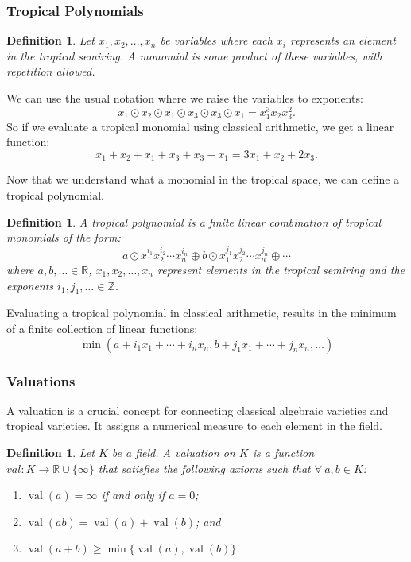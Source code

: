 \documentclass[11pt,reqno,a4paper]{article}
\theoremstyle{theoremstyle}
\theoremstyle{examplestyle}
\newtheorem{definition}[theorem]{Definition}
\theoremstyle{algorithmstyle}
\numberwithin{equation}{subsection}
\newcommand{\RR}{\mathbb{R}}
\DeclareMathOperator{\val}{val}
\begin{document}
\subsubsection*{Tropical Polynomials}

\begin{definition}
    Let $x_1, x_2, \ldots , x_n$ be variables where each $x_i$ represents an element in the tropical semiring. A \textit{monomial} is some product of these variables, with repetition allowed. 
\end{definition}
We can use the usual notation where we raise the variables to exponents:
\[ x_1 \odot x_2 \odot x_1 \odot x_3 \odot x_3 \odot x_1 = x_1^3x_2x_3^2.\]
So if we evaluate a tropical monomial using classical arithmetic, we get a linear function: \[x_1 + x_2 + x_1 + x_3 + x_3 + x_1 = 3x_1+x_2+2x_3.\]

Now that we understand what a monomial in the tropical space, we can define a tropical polynomial.

\begin{definition}
    A \textit{tropical polynomial} is a finite linear combination of tropical monomials of the form: \[a\odot x_1^{i_1}x_2^{i_2}\cdots x_n^{i_n} \oplus b \odot x_1^{j_1}x_2^{j_2}\cdots x_n^{j_n} \oplus \cdots \]
    where $a,b,\ldots \in \RR$, $x_1,x_2, \ldots ,x_n$ represent elements in the tropical semiring and the exponents $i_1,j_1,\ldots \in \mathbb{Z}$. 
\end{definition}
Evaluating a tropical polynomial in classical arithmetic, results in the minimum of a finite collection of linear functions: \[\min(a + i_1x_1 + \cdots + i_nx_n, b + j_1x_1 + \cdots + j_nx_n, \ldots)\]


\subsubsection*{Valuations} 
A valuation is a crucial concept for connecting classical algebraic varieties and tropical varieties. It assigns a numerical measure to each element in the field.

\begin{definition}
    Let $K$ be a field. A \textit{valuation} on $K$ is a function \\ $val:K\to\RR\cup\{\infty\}$ that satisfies the following axioms such that $\forall \  a,b\in K$:
    \begin{enumerate}
        \item $\val(a) = \infty$ if and only if $a=0$;
        \item $\val(ab) = \val(a) + \val(b)$; and
        \item $\val(a+b) \geq \min\{\val(a), \val(b)\}$.
        \end{enumerate}
\end{definition}
\end{document}
